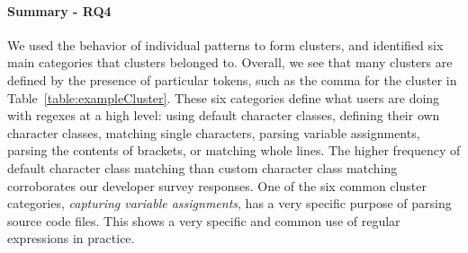 
\paragraph{Summary - RQ4}
We used the behavior of individual patterns to form clusters, and identified six main categories that clusters belonged to.  Overall, we see that many clusters are defined by the presence of particular tokens, such as the comma for the cluster in Table~\ref{table:exampleCluster}.
These six categories define what users are doing with regexes at a high level: using default character classes, defining their own character classes, matching single characters, parsing variable assignments, parsing the contents of brackets, or matching whole lines. The higher frequency of default character class matching than custom character class matching corroborates our developer survey responses.
 One of the six common cluster categories, \emph{capturing variable assignments}, has a very specific purpose of parsing source code files. This shows a very specific and common use of regular expressions in practice.


%
%
%
%








